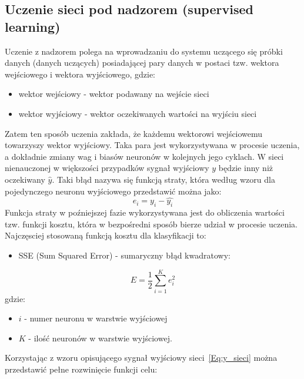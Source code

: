 \documentclass[12pt,twoside]{article}
\begin{document}
\subsection{Uczenie sieci pod nadzorem (supervised learning)}
Uczenie z nadzorem polega na wprowadzaniu do systemu uczącego się próbki danych (danych uczących) posiadającej pary danych w postaci tzw. wektora wejściowego i wektora wyjściowego, gdzie:
\begin{itemize}
	\setlength\itemsep{0em}
	\setlength{\parskip}{0pt}
	\item wektor wejściowy - wektor podawany na wejście sieci
	\item wektor wyjściowy - wektor oczekiwanych wartości na wyjściu sieci
\end{itemize}
Zatem ten sposób uczenia zakłada, że każdemu wektorowi wejściowemu towarzyszy wektor wyjściowy. Taka para jest wykorzystywana w procesie uczenia, a dokładnie zmiany wag i biasów neuronów w kolejnych jego cyklach.
W sieci nienauczonej w większości przypadków sygnał wyjściowy $y$ będzie inny niż oczekiwany $\hat{y}$. Taki błąd nazywa się funkcją straty, która według wzoru dla pojedynczego neuronu wyjściowego przedstawić można jako:
\begin{equation}
	e_{i}=y_{i}-\hat{y_{i}}
\end{equation}
Funkcja straty w poźniejszej fazie wykorzystywana jest do obliczenia wartości tzw. funkcji kosztu, która w bezpośredni sposób bierze udział w procesie uczenia. Najczęsciej stosowaną funkcją kosztu dla klasyfikacji to:
\begin{itemize}
	\item SSE (Sum Squared Error) - sumaryczny błąd kwadratowy:
\end{itemize}
\begin{equation}
	E = \frac{1}{2} \sum_{i=1}^{K} e_{i}^{2}
\end{equation}
gdzie:
\begin{itemize}
	\setlength\itemsep{0em}
	\setlength{\parskip}{0pt}
	\item $i$ - numer neuronu w warstwie wyjściowej
	\item $K$ - ilość neuronów w warstwie wyjściowej.
\end{itemize}
Korzystając z wzoru opisującego sygnał wyjściowy sieci~\ref{Eq:y_sieci} można przedstawić pełne rozwinięcie funkcji celu:
\end{document}
